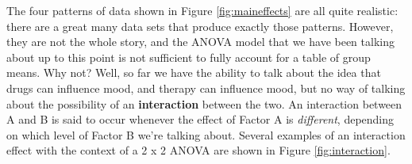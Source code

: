 \documentclass[
]{book}
\theoremstyle{definition}
\theoremstyle{definition}
\theoremstyle{definition}
\theoremstyle{definition}
\theoremstyle{remark}
\begin{document}
The four patterns of data shown in Figure \ref{fig:maineffects} are all quite realistic: there are a great many data sets that produce exactly those patterns. However, they are not the whole story, and the ANOVA model that we have been talking about up to this point is not sufficient to fully account for a table of group means. Why not? Well, so far we have the ability to talk about the idea that drugs can influence mood, and therapy can influence mood, but no way of talking about the possibility of an \textbf{interaction} between the two. An interaction between A and B is said to occur whenever the effect of Factor A is \emph{different}, depending on which level of Factor B we're talking about. Several examples of an interaction effect with the context of a 2 x 2 ANOVA are shown in Figure \ref{fig:interaction}.

\begin{figure}


\end{figure}
\end{document}
